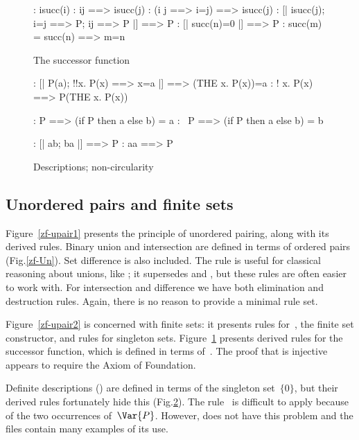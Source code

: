 \begin{figure}
\begin{alltt*}\isastyleminor
{}:    i\isasymin{}succ(i)
:    i\isasymin{}j ==> i\isasymin{}succ(j)
:    (i \isasymnotin j ==> i=j) ==> i\isasymin{}succ(j)
:     [| i\isasymin{}succ(j);  i=j ==> P;  i\isasymin{}j ==> P |] ==> P
:  [| succ(n)=0 |] ==> P
: succ(m) = succ(n) ==> m=n
\end{alltt*}
\caption{The successor function} \label{zf-succ}
\end{figure}


\begin{figure}
\begin{alltt*}\isastyleminor
{}: [| P(a); !!x. P(x) ==> x=a |] ==> (THE x. P(x))=a
:         \isasymexists! x. P(x) ==> P(THE x. P(x))

:          P ==> (if P then a else b) = a
:     ~P ==> (if P then a else b) = b

:     [| a\isasymin{}b;  b\isasymin{}a |] ==> P
:   a\isasymin{}a ==> P
\end{alltt*}
\caption{Descriptions; non-circularity} \label{zf-the}
\end{figure}


\subsection{Unordered pairs and finite sets}
Figure~\ref{zf-upair1} presents the principle of unordered pairing, along
with its derived rules.  Binary union and intersection are defined in terms
of ordered pairs (Fig.\ts\ref{zf-Un}).  Set difference is also included.  The
rule  is useful for classical reasoning about unions,
like \@; it supersedes  and
, but these rules are often easier to work with.  For
intersection and difference we have both elimination and destruction rules.
Again, there is no reason to provide a minimal rule set.

Figure~\ref{zf-upair2} is concerned with finite sets: it presents rules
for~, the finite set constructor, and rules for singleton
sets.  Figure~\ref{zf-succ} presents derived rules for the successor
function, which is defined in terms of~.  The proof that 
 is injective appears to require the Axiom of Foundation.

Definite descriptions () are defined in terms of the singleton
set~$\{0\}$, but their derived rules fortunately hide this
(Fig.\ts\ref{zf-the}).  The rule~ is difficult to apply
because of the two occurrences of~$\Var{P}$.  However,
 does not have this problem and the files contain
many examples of its use.

